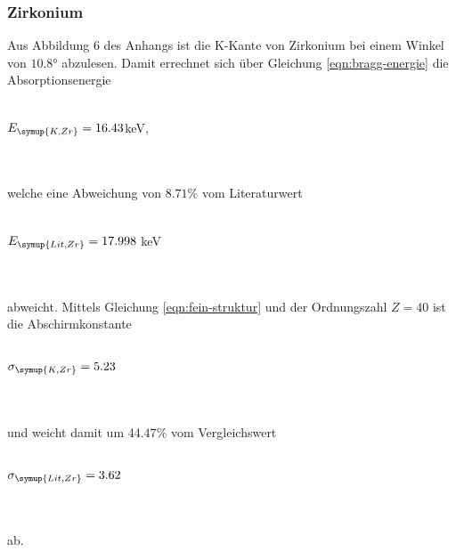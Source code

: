         \subsubsection{Zirkonium}
            Aus Abbildung 6 des Anhangs ist die K-Kante von Zirkonium bei einem 
            Winkel von $10.8°$ abzulesen.
            Damit errechnet sich über Gleichung \eqref{eqn:bragg-energie} die Absorptionsenergie
            \\ \\
            \centerline{$E_{\symup{K, Zr}} = 16.43$keV,}  
            \\ \\
            welche eine Abweichung von $8.71 \%$ vom Literaturwert
            \\ \\
            \centerline{$E_{\symup{Lit, Zr}} = 17.998$ keV \cite{periodic}}
            \\ \\
            abweicht. Mittels Gleichung \eqref{eqn:fein-struktur} und der Ordnungszahl $Z = 40$
            ist die Abschirmkonstante
            \\ \\
            \centerline{$\sigma_{\symup{K, Zr}} = 5.23$} 
            \\ \\
            und weicht damit um $44.47 \%$ vom Vergleichswert
            \\ \\
            \centerline{$\sigma_{\symup{Lit, Zr}} = 3.62$}
            \\ \\
            ab.
